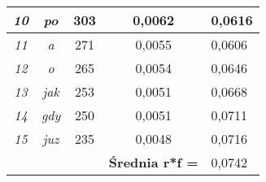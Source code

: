 \documentclass[a4paper]{article}
\begin{document}
\begin{table}
\begin{tabular}{ccc|c|l|}
\multicolumn{1}{|c|}{\textit{10}}                & \multicolumn{1}{c|}{\textit{po}}    & 303                               & 0,0062                                     & 0,0616 \\ \hline
\multicolumn{1}{|c|}{\textit{11}}                & \multicolumn{1}{c|}{\textit{a}}     & 271                               & 0,0055                                     & 0,0606 \\ \hline
\multicolumn{1}{|c|}{\textit{12}}                & \multicolumn{1}{c|}{\textit{o}}     & 265                               & 0,0054                                     & 0,0646 \\ \hline
\multicolumn{1}{|c|}{\textit{13}}                & \multicolumn{1}{c|}{\textit{jak}}   & 253                               & 0,0051                                     & 0,0668 \\ \hline
\multicolumn{1}{|c|}{\textit{14}}                & \multicolumn{1}{c|}{\textit{gdy}}   & 250                               & 0,0051                                     & 0,0711 \\ \hline
\multicolumn{1}{|c|}{\textit{15}}                & \multicolumn{1}{c|}{\textit{juz}}   & 235                               & 0,0048                                     & 0,0716 \\ \hline
\multicolumn{1}{l}{}                             &                                     &                                   & \textbf{Średnia r*f =}                     & 0,0742 \\ \cline{4-5} 
\end{tabular}
\end{table}
\end{document}
